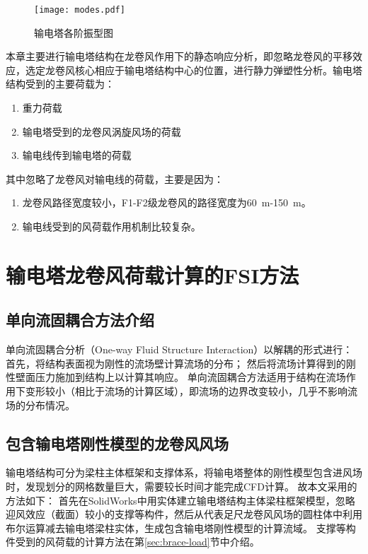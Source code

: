 \begin{figure}[!htbp]
	\centering
	\texttt{[image: modes.pdf]}
	\caption{输电塔各阶振型图}
	\label{fig:modes}
\end{figure}

本章主要进行输电塔结构在龙卷风作用下的静态响应分析，即忽略龙卷风的平移效应，选定龙卷风核心相应于输电塔结构中心的位置，进行静力弹塑性分析。输电塔结构受到的主要荷载为：
\begin{enumerate}
	\item 重力荷载
	\item 输电塔受到的龙卷风涡旋风场的荷载
	\item 输电线传到输电塔的荷载
\end{enumerate}
其中忽略了龙卷风对输电线的荷载，主要是因为：
\begin{enumerate}
	\item 龙卷风路径宽度较小，F1-F2级龙卷风的路径宽度为\SI{60}{m}-\SI{150}{m}。
	\item 输电线受到的风荷载作用机制比较复杂。
\end{enumerate}

\section{输电塔龙卷风荷载计算的FSI方法}

\subsection{单向流固耦合方法介绍}
单向流固耦合分析（One-way Fluid Structure Interaction）以解耦的形式进行\cite{benra2011comparison}\cite{qian2008fsi}：
首先，将结构表面视为刚性的流场壁计算流场的分布；
然后将流场计算得到的刚性壁面压力施加到结构上以计算其响应。
单向流固耦合方法适用于结构在流场作用下变形较小（相比于流场的计算区域），即流场的边界改变较小，几乎不影响流场的分布情况。

\subsection{包含输电塔刚性模型的龙卷风风场}\label{sec:tornado-fsi}
输电塔结构可分为梁柱主体框架和支撑体系，将输电塔整体的刚性模型包含进风场时，发现划分的网格数量巨大，需要较长时间才能完成CFD计算。
故本文采用的方法如下：
首先在SolidWorks中用实体建立输电塔结构主体梁柱框架模型，忽略迎风效应（截面）较小的支撑等构件，然后从代表足尺龙卷风风场的圆柱体中利用布尔运算减去输电塔梁柱实体，生成包含输电塔刚性模型的计算流域。
支撑等构件受到的风荷载的计算方法在第\ref{sec:brace-load}节中介绍。

